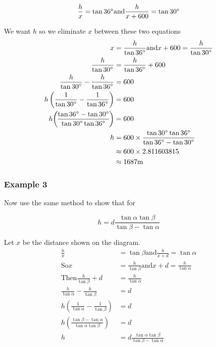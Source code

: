 \begin{equation*}\frac{h}{x} =\tan  36 \mbox{{\ensuremath{{}^\circ}}}\text{and}\frac{h}{x +600} =\tan  30 \mbox{{\ensuremath{{}^\circ}}}
\end{equation*}

We want $h$ so we eliminate $x$ between these two equations
\begin{align*}x &  =  \frac{h}{\tan  36 \mbox{{\ensuremath{{}^\circ}}}}\text{and}x +600 =\frac{h}{\tan  30 \mbox{{\ensuremath{{}^\circ}}}} \\
\frac{h}{\tan  30 \mbox{{\ensuremath{{}^\circ}}}} &  =  \frac{h}{\tan  36 \mbox{{\ensuremath{{}^\circ}}}} +600 \\
\frac{h}{\tan  30 \mbox{{\ensuremath{{}^\circ}}}} -\frac{h}{\tan  36 \mbox{{\ensuremath{{}^\circ}}}} &  =  600 \\
h \left (\frac{1}{\tan  30 \mbox{{\ensuremath{{}^\circ}}}} -\frac{1}{\tan  36 \mbox{{\ensuremath{{}^\circ}}}}\right ) &  =  600 \\
h \genfrac{(}{)}{}{}{\tan  36 \mbox{{\ensuremath{{}^\circ}}} -\tan  30 \mbox{{\ensuremath{{}^\circ}}}}{\tan  30 \mbox{{\ensuremath{{}^\circ}}} \tan  36 \mbox{{\ensuremath{{}^\circ}}}} &  =  600 \\
h &  =  600 \times \frac{\tan  30 \mbox{{\ensuremath{{}^\circ}}} \tan  36 \mbox{{\ensuremath{{}^\circ}}}}{\tan  36 \mbox{{\ensuremath{{}^\circ}}} -\tan  30 \mbox{{\ensuremath{{}^\circ}}}} \\
 &  \approx   600 \times 2.811603815 \\
 &  \approx   1687 \mbox{m}\end{align*}
\clearpage
\subsubsection{Example 3}
Now use the same method to show that for 
  
\setlength\fboxrule{0in}\setlength\fboxsep{0.2in}
\begin{equation*}h =d \frac{\tan  \alpha  \tan  \beta }{\tan  \beta  -\tan  \alpha }
\end{equation*}

Let $x$ be the distance shown on the diagram.
\begin{align*}\frac{h}{x} &  =  \tan  \beta \text{and}\frac{h}{x +d} =\tan  \alpha  \\
\text{So}x &  =  \frac{h}{\tan  \beta }\text{and}x +d =\frac{h}{\tan  \alpha } \\
\text{Then}\frac{h}{\tan  \beta } +d &  =  \frac{h}{\tan  \alpha } \\
\frac{h}{\tan  \alpha } -\frac{h}{\tan  \beta } &  =  d \\
h \left (\frac{1}{\tan  \alpha } -\frac{1}{\tan  \beta }\right ) &  =  d \\
h \genfrac{(}{)}{}{}{\tan  \beta  -\tan  \alpha }{\tan  \alpha  \tan  \beta } &  =  d \\
h &  =  d \frac{\tan  \alpha  \tan  \beta }{\tan  \beta  -\tan  \alpha }\end{align*}

